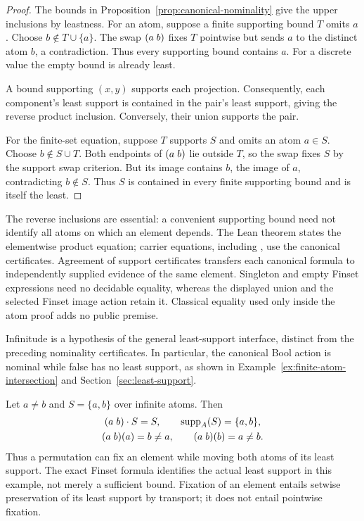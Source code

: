 \begin{proof}
The bounds in Proposition~\ref{prop:canonical-nominality} give the
upper inclusions by leastness. For an atom, suppose a finite supporting
bound $T$ omits $a$. Choose $b\notin T\cup\{a\}$. The swap $(a\;b)$
fixes $T$ pointwise but sends $a$ to the distinct atom $b$, a contradiction.
Thus every supporting bound contains $a$. For a discrete value the empty
bound is already least.

A bound supporting $(x,y)$ supports each projection. Consequently, each
component's least support is contained in the pair's least support, giving
the reverse product inclusion. Conversely, their union supports the pair.

For the finite-set equation, suppose $T$ supports $S$ and omits an atom
$a\in S$. Choose $b\notin S\cup T$. Both endpoints of $(a\;b)$ lie
outside $T$, so the swap fixes $S$ by the support swap criterion. But its
image contains $b$, the image of $a$, contradicting $b\notin S$. Thus
$S$ is contained in every finite supporting bound and is itself the least.
\end{proof}

The reverse inclusions are essential: a convenient supporting bound need
not identify all atoms on which an element depends. The Lean theorem
 states the elementwise product
equation; carrier equations, including , use the
canonical certificates. Agreement of support certificates transfers each
canonical formula to independently supplied evidence of the same element.
Singleton and empty Finset expressions need no decidable equality, whereas
the displayed union and the selected Finset image action retain it.
Classical equality used only inside the atom proof adds no public premise.

Infinitude is a hypothesis of the general least-support interface, distinct
from the preceding nominality certificates. In particular, the canonical
Bool action is nominal while false has no least support, as shown in
Example~\ref{ex:finite-atom-intersection} and
Section~\ref{sec:least-support}.

\begin{example}
\label{ex:unordered-pair-support}
Let $a\ne b$ and $S=\{a,b\}$ over infinite atoms. Then
\begin{gather*}
  (a\;b)\mathbin{\cdot} S=S,\qquad \operatorname{supp}_A(S)=\{a,b\},
  \\
  (a\;b)(a)=b\ne a,\qquad (a\;b)(b)=a\ne b.
\end{gather*}
Thus a permutation can fix an element while moving both atoms of its
least support. The exact Finset formula identifies the actual least
support in this example, not merely a sufficient bound. Fixation of an
element entails setwise preservation of its least support by transport;
it does not entail pointwise fixation.
\end{example}

